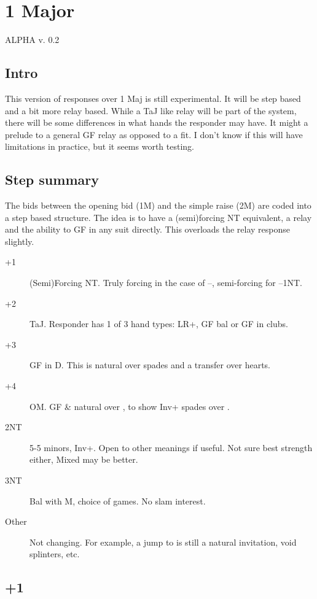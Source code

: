 \documentclass[tom-ari]{subfile}
\begin{document}
	
	\chapter{1 Major}
	
	\Huge{\color{red}ALPHA v. 0.2}
	
	\section{Intro}
	
	\normalsize 
	
	This version of responses over 1 Maj is still experimental.  It will be step based and a bit more relay based.  While a TaJ like relay will be part of the system, there will be some differences in what hands the responder may have.  It might a prelude to a general GF relay as opposed to a fit.  I don't know if this will have limitations in practice, but it seems worth testing.
	
	\section{Step summary} 
	
	The bids between the opening bid (1M) and the simple raise (2M) are coded into a step based structure.  The idea is to have a (semi)forcing NT equivalent, a relay and the ability to GF in any suit directly.  This overloads the relay response slightly.
	
	\begin{description}
		\item[+1] (Semi)Forcing NT.  Truly forcing in the case of --, semi-forcing for --1NT.
		\item[+2] TaJ.  Responder has 1 of 3 hand types: LR+, GF bal or GF in clubs.
		\item[+3] GF in D.  This is natural over spades and a transfer over hearts.
		\item[+4] OM.  GF \& natural over ,  to show Inv+ spades over .
		\item[2NT] 5-5 minors, Inv+.  Open to other meanings if useful. Not sure best strength either, Mixed may be better.
		\item[3NT]  Bal with M, choice of games.  No slam interest.
		\item[Other] Not changing.  For example, a jump to  is still a natural invitation, void splinters, etc.
	\end{description}

	\section{+1}
	
\end{document}
